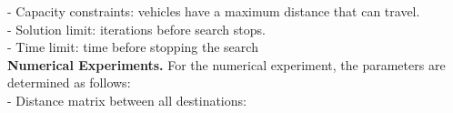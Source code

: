 \documentclass[10pt,bezier]{article}
\begin{document}
 \noindent - Capacity constraints: vehicles have a maximum distance that can travel.\\
 - Solution limit: iterations before search stops.\\
 - Time limit: time before stopping the search\\

\textbf{Numerical Experiments.}
For the numerical experiment, the parameters are determined as follows:\\

- Distance matrix between all destinations:
\end{document}
